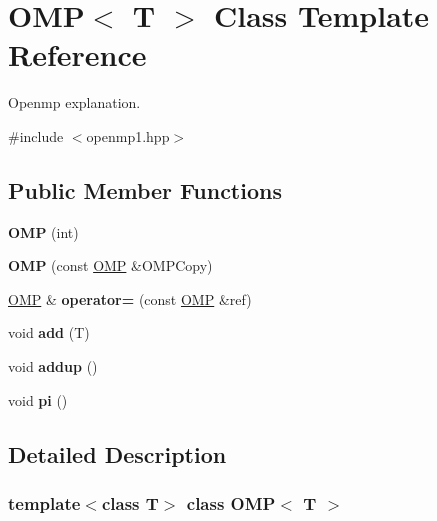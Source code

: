 \hypertarget{classOMP}{}\section{O\+MP$<$ T $>$ Class Template Reference}
\label{classOMP}


Openmp explanation.  




{\ttfamily \#include $<$openmp1.\+hpp$>$}

\subsection*{Public Member Functions}
\begin{DoxyCompactItemize}
\item 
\mbox{\label{classOMP_aa2d683844b0c792f2e4b8004282c3c4f}} 
{\bfseries O\+MP} (int)
\item 
\mbox{\label{classOMP_a74734b9e39249242a4d81c4c843a8497}} 
{\bfseries O\+MP} (const \hyperlink{classOMP}{O\+MP} \&O\+M\+P\+Copy)
\item 
\mbox{\label{classOMP_a8e5d794021f25dc36d486d0a268d7713}} 
\hyperlink{classOMP}{O\+MP} \& {\bfseries operator=} (const \hyperlink{classOMP}{O\+MP} \&ref)
\item 
\mbox{\label{classOMP_a4d9450a0c0304e2cd2d705ca06e450cc}} 
void {\bfseries add} (T)
\item 
\mbox{\label{classOMP_a315d43939578681fd9ffc52259e81996}} 
void {\bfseries addup} ()
\item 
\mbox{\label{classOMP_af2e1072e3c0bf76fd14379eeca69dff9}} 
void {\bfseries pi} ()
\end{DoxyCompactItemize}


\subsection{Detailed Description}
\subsubsection*{template$<$class T$>$\newline
class O\+M\+P$<$ T $>$}

